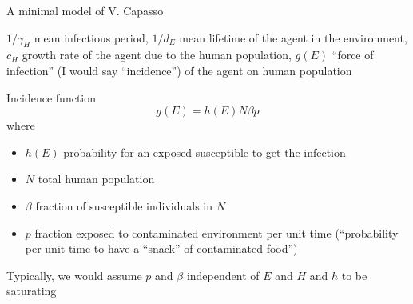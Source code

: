 \documentclass[aspectratio=169]{beamer}
\begin{document}
\begin{frame}{A minimal model of V. Capasso}
  \begin{center}
    \def\vertskip{*1.75}
    \def\horzskip{*2}
  \end{center}  
  $1/\gamma_H$ mean infectious period, $1/d_E$ mean lifetime of the agent in the environment, $c_H$ growth rate of the agent due to the human population, $g(E)$ ``force of infection'' (I would say ``incidence'') of the agent on human population
\end{frame}

\begin{frame}{Incidence function}
  \begin{equation}
    \label{eq:incidence_function_Capasso}
    g(E) = h(E)N\beta p
  \end{equation}
  where
  \begin{itemize}
    \item $h(E)$ probability for an exposed susceptible to get the infection
    \item $N$ total human population
    \item $\beta$ fraction of susceptible individuals in $N$
    \item $p$ fraction exposed to contaminated environment per unit time (``probability per unit time to have a ``snack'' of contaminated food'')
  \end{itemize}
  Typically, we would assume $p$ and $\beta$ independent of $E$ and $H$ and $h$ to be saturating
\end{frame}
\end{document}
